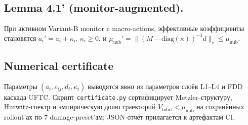 \documentclass[a4paper,14pt]{extarticle}
\begin{document}
\subsection{Lemma 4.1' (monitor-augmented).}

При активном Variant-B monitor c macro-actions, эффективные коэффициенты
становятся $a_i' = a_i + \kappa_i$, $\kappa_i\ge 0$, и
$\mu_{\mathrm{uub}}' = \|(M-\mathrm{diag}(\kappa))^{-1} d\|_c \le \mu_{\mathrm{uub}}$.

\subsection{Numerical certificate}

Параметры $(a_i,\varepsilon_{ij},d_i,\kappa_i)$ выводятся явно из
параметров слоёв L1--L4 и FDD каскада UFTC.
Скрипт \texttt{certificate.py} сертифицирует Metzler-структуру,
Hurwitz-спектр и эмпирическую долю траекторий $V_{\mathrm{total}} <
\mu_{\mathrm{uub}}$ на сохранённых rollout'ах по 7 damage-preset'ам;
JSON-отчёт прилагается к артефактам CI.



\end{document}
